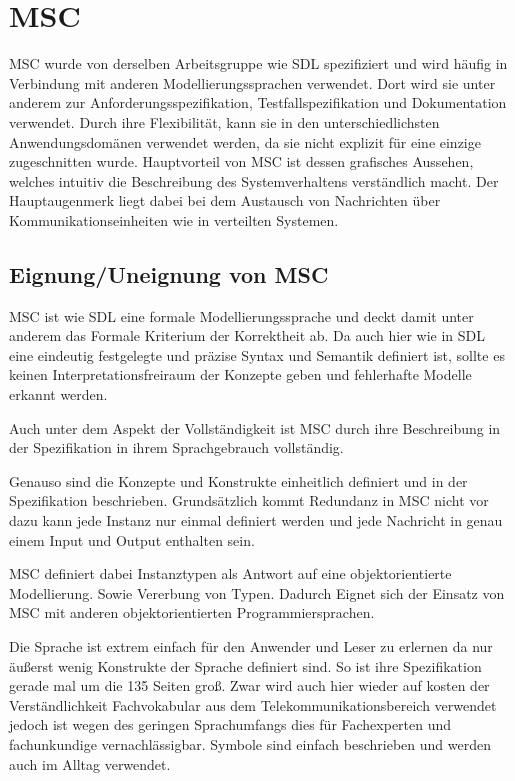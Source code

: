 \section{MSC}
\label{sc:MSCB}
\ac{MSC} wurde von derselben Arbeitsgruppe wie \ac{SDL} spezifiziert und wird häufig in Verbindung mit anderen Modellierungssprachen verwendet. Dort wird sie unter anderem zur Anforderungsspezifikation, Testfallspezifikation und Dokumentation verwendet. Durch ihre Flexibilität, kann sie in den unterschiedlichsten Anwendungsdomänen verwendet werden, da sie nicht explizit für eine einzige zugeschnitten wurde. Hauptvorteil von \ac{MSC} ist dessen grafisches Aussehen, welches intuitiv die Beschreibung des Systemverhaltens verständlich macht. Der Hauptaugenmerk liegt dabei bei dem Austausch von Nachrichten über Kommunikationseinheiten wie in verteilten Systemen.
\subsection{Eignung/Uneignung von MSC}
\label{sc:MSCEignung}
\ac{MSC} ist wie \ac{SDL} eine formale Modellierungssprache und deckt damit unter anderem das Formale Kriterium der Korrektheit  ab. Da auch hier wie in \ac{SDL} eine eindeutig festgelegte und präzise Syntax und Semantik definiert ist, sollte es keinen Interpretationsfreiraum der Konzepte geben und fehlerhafte Modelle erkannt werden.

Auch unter dem Aspekt der Vollständigkeit ist \ac{MSC} durch ihre Beschreibung in der Spezifikation in ihrem Sprachgebrauch vollständig.

Genauso sind die Konzepte und Konstrukte einheitlich definiert und in der Spezifikation beschrieben. Grundsätzlich kommt Redundanz in \ac{MSC} nicht vor dazu kann jede Instanz nur einmal definiert werden und jede Nachricht in genau einem Input und Output enthalten sein.

MSC definiert dabei Instanztypen als Antwort auf eine objektorientierte Modellierung. Sowie Vererbung von Typen. Dadurch Eignet sich der Einsatz von \ac{MSC} mit anderen objektorientierten Programmiersprachen.

Die Sprache ist extrem einfach für den Anwender und Leser zu erlernen da nur äußerst wenig Konstrukte der Sprache definiert sind. So ist ihre Spezifikation gerade mal um die 135 Seiten groß. Zwar wird auch hier wieder auf kosten der Verständlichkeit Fachvokabular aus dem Telekommunikationsbereich verwendet jedoch ist wegen des geringen Sprachumfangs dies für Fachexperten und fachunkundige vernachlässigbar. Symbole sind einfach beschrieben und werden auch im Alltag verwendet.

